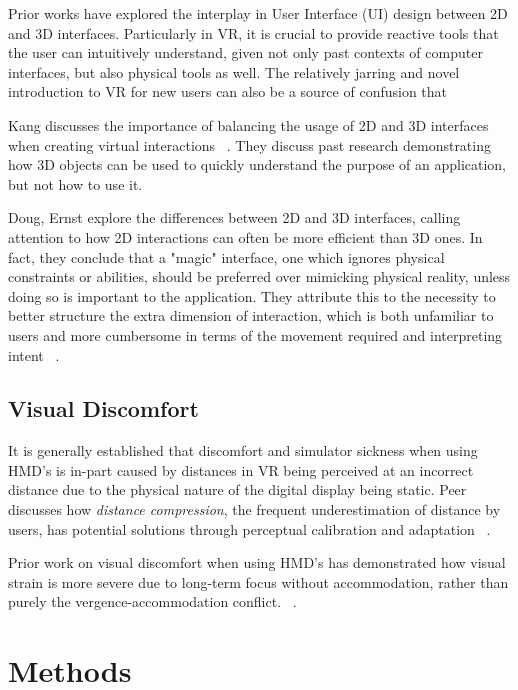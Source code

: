 \documentclass[10pt,twocolumn,letterpaper]{article}
\begin{document}
Prior works have explored the interplay in User Interface (UI) design between 2D and 3D interfaces. Particularly in VR, it is crucial to provide reactive tools that the user can intuitively understand, given not only past contexts of computer interfaces, but also physical tools as well. The relatively jarring and novel introduction to VR for new users can also be a source of confusion that

Kang discusses the importance of balancing the usage of 2D and 3D interfaces when creating virtual interactions ~\cite{7892351}. They discuss past research demonstrating how 3D objects can be used to quickly understand the purpose of an application, but not how to use it.

Doug, Ernst \etal explore the differences between 2D and 3D interfaces, calling attention to how 2D interactions can often be more efficient than 3D ones. In fact, they conclude that a "magic" interface, one which ignores physical constraints or abilities, should be preferred over mimicking physical reality, unless doing so is important to the application. They attribute this to the necessity to better structure the extra dimension of interaction, which is both unfamiliar to users and more cumbersome in terms of the movement required and interpreting intent ~\cite{442977420010201}.

\subsection{Visual Discomfort}

It is generally established that discomfort and simulator sickness when using HMD's is in-part caused by distances in VR being perceived at an incorrect distance due to the physical nature of the digital display being static. Peer discusses how \textit{distance compression}, the frequent underestimation of distance by users, has potential solutions through perceptual calibration and adaptation ~\cite{7892353}.

Prior work on visual discomfort when using HMD's has demonstrated how visual strain is more severe due to long-term focus without accommodation, rather than purely the vergence-accommodation conflict. ~\cite{7892270}.


\section{Methods}
\end{document}
